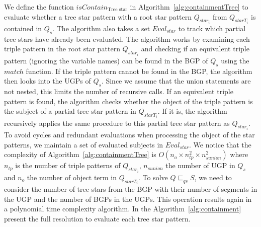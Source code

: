 We define the function $isContain_{\text{Tree star}}$ in Algorithm~\ref{alg:containmentTree} to evaluate whether a tree star pattern with a root star pattern $Q_{star_i}$ from $Q_{starT_i}$ is contained in $Q_s$. 
The algorithm also takes a set $Eval_{star}$ to track which partial tree stars have already been evaluated.
The algorithm works by examining each triple pattern in the root star pattern $Q_{star_i}$ and checking if an equivalent triple pattern (ignoring the variable names) can be found in the BGP of $Q_s$ using the $match$ function.
If the triple pattern cannot be found in the BGP, the algorithm then looks into the UGPs of $Q_s$. 
Since we assume that the union statements are not nested, this limits the number of recursive calls.
If an equivalent triple pattern is found, the algorithm checks whether the object of the triple pattern is the subject of a partial tree star pattern in $Q_{starT_i}$.
If it is, the algorithm recursively applies the same procedure to this partial tree star pattern as $Q_{star_i}$.
To avoid cycles and redundant evaluations when processing the object of the star patterns, we maintain a set of evaluated subjects in $Eval_{star}$.
We notice that the complexity of Algorithm~\ref{alg:containmentTree} is $O( n_o \times n_{tp}^2 \times n_{sunion}^2)$
where $n_{tp}$ is the number of triple patterns of $Q_{star_i}$, $n_{sunion}$ the number of UGP in $Q_s$ and $n_o$ the number of object term in $Q_{starT_i}$.
To solve $Q \sqsubseteq_{qs} S$, we need to consider the number of tree stars from the BGP with their number of segments in the UGP and the number of BGPs in the UGPs.
This operation results again in a polynomial time complexity algorithm.
In the  Algorithm~\ref{alg:containment} present the full resolution to evaluate each tree star pattern.

